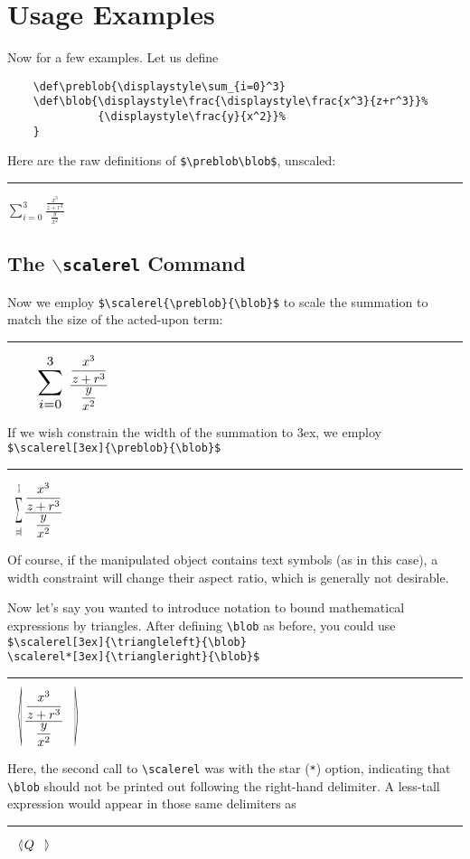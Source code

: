 \documentclass{article}
\newcommand\rl{\rule{2em}{0in}}
\let\vb\verb
\begin{document}
\section{Usage Examples}

Now for a few examples.  Let us define
\begin{verbatim}
    \def\preblob{\displaystyle\sum_{i=0}^3}
    \def\blob{\displaystyle\frac{\displaystyle\frac{x^3}{z+r^3}}%
              {\displaystyle\frac{y}{x^2}}%
    }
\end{verbatim}
    \def\preblob{\displaystyle\sum_{i=0}^3}
    \def\blob{\displaystyle\frac{\displaystyle\frac{x^3}{z+r^3}}%
              {\displaystyle\frac{y}{x^2}}%
    }
Here are the raw definitions of \vb|$\preblob\blob$|, unscaled:

    \rl$\preblob\blob$

\subsection{The $\backslash$\texttt{scalerel} Command}

Now we employ \vb|$\scalerel{\preblob}{\blob}$| to scale the summation 
  to match the size of the acted-upon term:

    \rl$\scalerel{\preblob}{\blob}$

If we wish constrain the width of the summation to 3ex, we employ\\
\vb|$\scalerel[3ex]{\preblob}{\blob}$|

    \rl$\scalerel[3ex]{\preblob}{\blob}$

Of course, if the manipulated object contains text symbols (as in
  this case), a width constraint will change their aspect ratio, 
  which is generally not desirable.

Now let's say you wanted to introduce notation to bound mathematical
expressions by triangles. After defining
\vb|\blob| as before, you could use\\
\vb|$\scalerel[3ex]{\triangleleft}{\blob}|\\
\vb|\scalerel*[3ex]{\triangleright}{\blob}$|

\rl%
$\scalerel[3ex]{\triangleleft}{\blob}\scalerel*[3ex]{\triangleright}{\blob}$

Here, the second call to \vb|\scalerel| was with the star (\vb|*|)
option, indicating that \vb|\blob| should not be printed out following
the right-hand delimiter.  A less-tall expression would appear in those
same delimiters as

\rl%
$\scalerel[3ex]{\triangleleft}{Q}\scalerel*[3ex]{\triangleright}{Q}$
\end{document}
